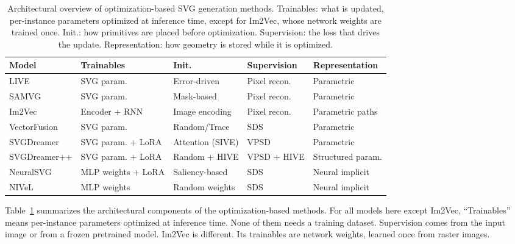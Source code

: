 \begin{table}[htbp]
\centering
\caption{Architectural overview of optimization-based 
SVG generation methods. Trainables: what is updated, 
per-instance parameters optimized at inference time, 
except for Im2Vec, whose network weights are trained once. 
Init.: how primitives are placed before optimization. 
Supervision: the loss that drives the update. 
Representation: how geometry is stored while it is optimized.}
\label{tab:arch_optbased}
\footnotesize
\begin{tabularx}{\textwidth}{@{}l l l l X@{}}
\toprule
\textbf{Model} & \textbf{Trainables} & \textbf{Init.} 
& \textbf{Supervision} & \textbf{Representation} \\
\midrule
LIVE         & SVG param.          & Error-driven     
             & Pixel recon.        & Parametric       \\
SAMVG        & SVG param.          & Mask-based       
             & Pixel recon.        & Parametric       \\
Im2Vec       & Encoder + RNN       & Image encoding   
             & Pixel recon.        & Parametric paths \\
VectorFusion & SVG param.          & Random/Trace     
             & SDS                 & Parametric       \\
SVGDreamer   & SVG param. + LoRA   & Attention (SIVE) 
             & VPSD                & Parametric       \\
SVGDreamer++ & SVG param. + LoRA   & Random + HIVE    
             & VPSD + HIVE         & Structured param.\\
NeuralSVG    & MLP weights + LoRA  & Saliency-based   
             & SDS                 & Neural implicit  \\
NIVeL        & MLP weights         & Random weights   
             & SDS                 & Neural implicit  \\
\bottomrule
\end{tabularx}
\end{table}

Table~\ref{tab:arch_optbased} summarizes the 
architectural components of the optimization-based 
methods. For all models here except Im2Vec, 
``Trainables'' means per-instance parameters optimized 
at inference time. None of them needs a training 
dataset. Supervision comes from the input image or from 
a frozen pretrained model. Im2Vec is different. Its 
trainables are network weights, learned once from 
raster images.



